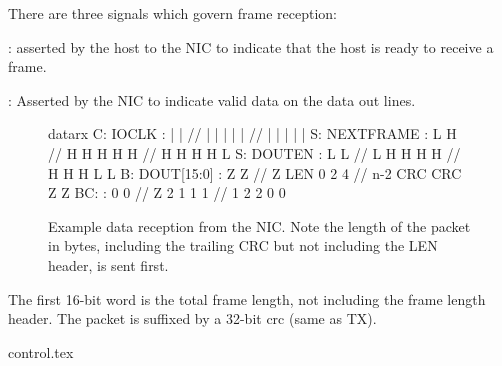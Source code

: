 There are three signals which govern frame reception: 

: asserted by the host to the NIC to indicate that the host is ready to receive a frame. 

: Asserted by the NIC to indicate valid data on the data out lines. 


\begin{figure}
\begin{timing}{datarx}
C: IOCLK      :  |  |   //   |  |   |  |  |  // |   |   |   | |   
S: NEXTFRAME  :  L  H   //   H  H   H  H  H  // H   H   H   H L 
S: DOUTEN     :  L  L   //   L  H   H  H  H  // H   H   H   L L 
B: DOUT[15:0] :  Z  Z   //   Z  LEN 0  2  4  // n-2 CRC CRC Z Z
BC:           :  0  0   //   Z  2   1  1  1  // 1   2   2   0 0
\end{timing}
\caption{Example data reception from the NIC. Note the length of the
  packet in bytes, including the trailing CRC but not including the
  LEN header, is sent first.} 
\end{figure}

The first 16-bit word is the total frame length, not including the
frame length header. The packet is suffixed by a 32-bit crc (same as
TX).

{control.tex}
